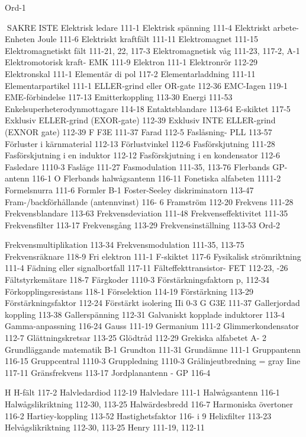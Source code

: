 \documentclass[a4paper,twoside,twocolumn,openright]{book}
\begin{document}
{{{{{{{{{{{Ord-1

SAKRE ISTE
Elektrisk ledare 111-1
Elektrisk spänning 111-4
Elektriskt arbete- Enheten Joule 111-6
Elektriskt kraftfält 111-11
Elektromagnet 111-15
Elektromagnetiskt fält 111-21, 22, 117-3
Elektromagnetisk våg 111-23, 117-2, A-1
Elektromotorisk kraft- EMK 111-9
Elektron 111-1
Elektronrör 112-29
Elektronskal 111-1
Elementär di pol 117-2
Elementarladdning 111-11
Elementarpartikel 111-1
ELLER-grind eller OR-gate 112-36
EMC-Iagen 119-1
EME-förbindelse 117-13
Emitterkoppling 113-30
Energi 111-53
Enkelsuperheterodynmottagare 114-18
Entaktsblandare 113-64
E-skiktet 117-5
Exklusiv ELLER-grind (EXOR-gate) 112-39
Exklusiv INTE ELLER-grind (EXNOR gate)
112-39
F
F3E 111-37
Farad 112-5
Faslåsning- PLL 113-57
Förluster i kärnmaterial 112-13
Förlustvinkel 112-6
Fasförskjutning 111-28
Fasförskjutning i en induktor 112-12
Fasförskjutning i en kondensator 112-6
Fasledare 1110-3
Fasläge 111-27
Fasmodulation 111-35, 113-76
Flerbands GP-antenn 116-1 O
Flerbands halwågsantenn 116-11
Fonetiska alfabeten 1111-2
Formelsnurra 111-6
Formler B-1
Foster-Seeley diskriminatorn 113-47
Fram-/backförhållande (antennvinst) 116- 6
Framström 112-20
Frekvens 111-28
Frekvensblandare 113-63
Frekvensdeviation 111-48
Frekvenseffektivitet 111-35
Frekvensfilter 113-17
Frekvensgång 113-29
Frekvensinställning 113-53
Ord-2

Frekvensmultiplikation 113-34
Frekvensmodulation 111-35, 113-75
Frekvensräknare 118-9
Fri elektron 111-1
F-skiktet 117-6
Fysikalisk strömriktning 111-4
Fädning eller signalbortfall 117-11
Fälteffekttransistor- FET 112-23, -26
Fältstyrkemätare 118-7
Färgkoder 1110-3
Förstärkningsfaktorn p, 112-34
Förkopplingsresistans 118-1
Förselektion 114-19
Förstärkning 113-29
Förstärkningsfaktor 112-24
Förstärkt isolering IIi 0-3
G
G3E 111-37
Gallerjordad koppling 113-38
Gallerspänning 112-31
Galvaniskt kopplade induktorer 113-4
Gamma-anpassning 116-24
Gauss 111-19
Germanium 111-2
Glimmerkondensator 112-7
Glättningskretsar 113-25
Glödtråd 112-29
Grekiska alfabetet A- 2
Grundläggande matematik B-1
Grundton 111-31
Grundämne 111-1
Gruppantenn 116-15
Gruppcentral 1110-3
Gruppledning 1110-3
Grålinjeutbredning = gray Iine 117-11
Gränsfrekvens 113-17
Jordplanantenn - GP 116-4

H
H-fält 117-2
Halvledardiod 112-19
Halvledare 111-1
Halwågsantenn 116-1
Halwågslikriktning 112-30, 113-25
Halwärdesbredd 116-7
Harmoniska övertoner 116-2
Hartiey-koppling 113-52
Hastighetsfaktor 116- i 9
Helixfilter 113-23
Helvågslikriktning 112-30, 113-25
Henry 111-19, 112-11

}}}}}}}}}}}
\end{document}
